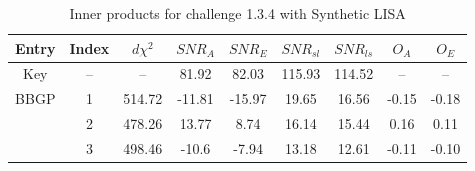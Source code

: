 \documentclass[prd,aps,amsfonts,amsmath, nofootinbib]{revtex4}
\begin{document}
\begin{table}
\caption{\label{OlapsTable1.3.4} Inner products for challenge 1.3.4
with Synthetic LISA}
\begin{ruledtabular}
\begin{tabular}{|c|c|c|c|c|c|c|c|c|}
Entry & Index & $d\chi^2$ & $SNR_A$ & $SNR_E$ & $SNR_{sl}$ & $SNR_{ls}$ & $O_A$ & $O_E$\\
\hline
Key  & -- & -- &  81.92 & 82.03 & 115.93 & 114.52 & -- & -- \\
\hline
BBGP & 1  & 514.72 & -11.81 & -15.97 & 19.65 & 16.56 & -0.15 & -0.18 \\
     & 2  &  478.26  & 13.77 & 8.74 & 16.14 & 15.44 & 0.16 & 0.11 \\
     & 3  & 498.46  & -10.6 & -7.94 & 13.18 & 12.61 &-0.11 &  -0.10 \\
\hline
\end{tabular}
\end{ruledtabular}
\end{table}
\end{document}
